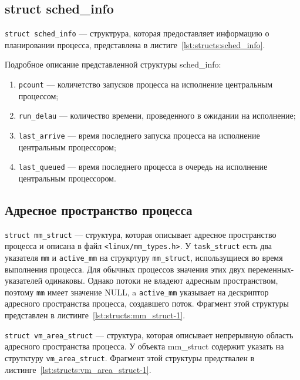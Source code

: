\subsection*{struct sched\_info}

\texttt{struct sched\_info} ---  структрура, которая предоставляет информацию о планировании процесса, представлена в листиге~\ref{lst:structs:sched_info}.



Подробное описание представленной структуры sched\_info:
\begin{enumerate}
	\item \texttt{pcount} --- количетство запусков процесса на исполнение центральным процессом;
	\item \texttt{run\_delau} --- количество времени, проведенного в ожидании на исполнение;
	\item \texttt{last\_arrive} --- время последнего запуска процесса на исполнение центральным процессором;
	\item \texttt{last\_queued} --- время последнего процесса в очередь на исполнение  центральным процессором.
\end{enumerate}

\subsection{Адресное пространство процесса}

\texttt{struct~mm\_struct} --- структура, которая описывает адресное пространство процесса и описана в файл \texttt{<linux/mm\_types.h>}.
У \texttt{task\_struct} есть два указателя \texttt{mm} и  \texttt{active\_mm} на струкртуру \texttt{mm\_struct}, использущиеся во время выполнения процесса. Для обычных процессов значения этих двух переменных-указателей одинаковы. Однако потоки не владеют адресным пространством, поэтому \texttt{mm} имеет значение NULL, a \texttt{active\_mm} указывает на дескриптор адресного пространства процесса, создавшего поток.
Фрагмент этой структуры представлен в листинге~\ref{lst:structs:mm_struct-1}.




\texttt{struct vm\_area\_struct} --- структура, которая описывает непрерывную область адресного пространства процесса.
У объекта {mm\_struct} содержит указать на струтктуру  \texttt{vm\_area\_struct}. Фрагмент этой структуры предствален в листинге~\ref{lst:structs:vm_area_struct-1}.

